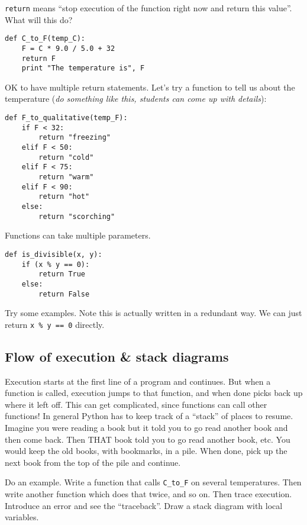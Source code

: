 \documentclass{article}
\begin{document}
\verb|return| means ``stop execution of the function right now and
return this value''.  What will this do?

\begin{verbatim}
def C_to_F(temp_C):
    F = C * 9.0 / 5.0 + 32
    return F
    print "The temperature is", F
\end{verbatim}

OK to have multiple return statements.  Let's try a function to tell
us about the temperature (\emph{do something like this, students can
  come up with details}):
\begin{verbatim}
def F_to_qualitative(temp_F):
    if F < 32:
        return "freezing"
    elif F < 50:
        return "cold"
    elif F < 75:
        return "warm"
    elif F < 90:
        return "hot"
    else:
        return "scorching"
\end{verbatim}

Functions can take multiple parameters.

\begin{verbatim}
def is_divisible(x, y):
    if (x % y == 0):
        return True
    else:
        return False
\end{verbatim}

Try some examples.  Note this is actually written in a redundant way.  We
can just return \verb|x % y == 0| directly.

\subsection*{Flow of execution \& stack diagrams}

Execution starts at the first line of a program and continues.  But
when a function is called, execution jumps to that function, and when
done picks back up where it left off.  This can get complicated, since
functions can call other functions!  In general Python has to keep
track of a ``stack'' of places to resume.  Imagine you were reading a
book but it told you to go read another book and then come back.  Then
THAT book told you to go read another book, etc.  You would keep the
old books, with bookmarks, in a pile.  When done, pick up the next
book from the top of the pile and continue.

Do an example. Write a function that calls \verb|C_to_F| on several
temperatures.  Then write another function which does that twice, and
so on.  Then trace execution.  Introduce an error and see the
``traceback''.  Draw a stack diagram with local variables.
\end{document}
